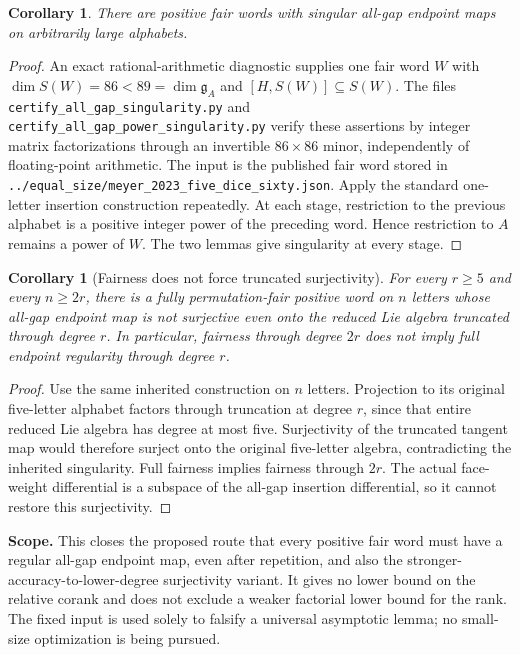 \documentclass[11pt]{article}
\newtheorem{corollary}[lemma]{Corollary}
\begin{document}
\begin{corollary}
There are positive fair words with singular all-gap endpoint maps on
arbitrarily large alphabets.
\end{corollary}
\begin{proof}
An exact rational-arithmetic diagnostic supplies one fair word $W$ with
$\dim S(W)=86<89=\dim\mathfrak g_A$ and
$[H,S(W)]\subseteq S(W)$. The files
\texttt{certify\_all\_gap\_singularity.py} and
\texttt{certify\_all\_gap\_power\_singularity.py} verify these assertions
by integer matrix factorizations through an invertible $86\times86$
minor, independently of floating-point arithmetic. The input is the
published fair word stored in
\texttt{../equal\_size/meyer\_2023\_five\_dice\_sixty.json}.
Apply the standard one-letter insertion construction repeatedly. At each
stage, restriction to the previous alphabet is a positive integer power
of the preceding word. Hence restriction to $A$ remains a power of $W$.
The two lemmas give singularity at every stage.
\end{proof}

\begin{corollary}[Fairness does not force truncated surjectivity]
For every $r\ge5$ and every $n\ge2r$, there is a fully
permutation-fair positive word on $n$ letters whose all-gap endpoint
map is not surjective even onto the reduced Lie algebra truncated
through degree $r$. In particular, fairness through degree $2r$
does not imply full endpoint regularity through degree $r$.
\end{corollary}
\begin{proof}
Use the same inherited construction on $n$ letters. Projection to
its original five-letter alphabet factors through truncation at
degree $r$, since that entire reduced Lie algebra has degree at
most five. Surjectivity of the truncated tangent map would therefore
surject onto the original five-letter algebra, contradicting the
inherited singularity. Full fairness implies fairness through $2r$.
The actual face-weight differential is a subspace of the all-gap
insertion differential, so it cannot restore this surjectivity.
\end{proof}

\noindent\textbf{Scope.} This closes the proposed route that every
positive fair word must have a regular all-gap endpoint map, even after
repetition, and also the stronger-accuracy-to-lower-degree surjectivity
variant. It gives no lower bound on the relative corank and does not
exclude a weaker factorial lower bound for the rank. The fixed input is
used solely to falsify a universal asymptotic lemma; no small-size
optimization is being pursued.
\end{document}
